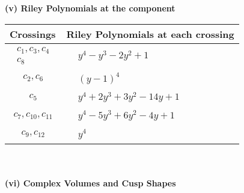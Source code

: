 \documentclass[1p]{elsarticle_modified}
\theoremstyle{definition}
\begin{document}
\newpage\renewcommand{\arraystretch}{1}
\flushleft \textbf{(v) Riley Polynomials at the component}\newline \\
\begin{tabular}{m{50pt}|m{274pt}}
Crossings & \hspace{64pt}Riley Polynomials at each crossing \\
\hline $$\begin{aligned}c_{1},c_{3},c_{4}\\c_{8}\end{aligned}$$&$\begin{aligned}
&y^4- y^3-2 y^2+1
\end{aligned}$\\
\hline $$\begin{aligned}c_{2},c_{6}\end{aligned}$$&$\begin{aligned}
&(y-1)^4
\end{aligned}$\\
\hline $$\begin{aligned}c_{5}\end{aligned}$$&$\begin{aligned}
&y^4+2 y^3+3 y^2-14 y+1
\end{aligned}$\\
\hline $$\begin{aligned}c_{7},c_{10},c_{11}\end{aligned}$$&$\begin{aligned}
&y^4-5 y^3+6 y^2-4 y+1
\end{aligned}$\\
\hline $$\begin{aligned}c_{9},c_{12}\end{aligned}$$&$\begin{aligned}
&y^4
\end{aligned}$\\
\hline
\end{tabular}\\~\\
\newpage\flushleft \textbf{(vi) Complex Volumes and Cusp Shapes}
\end{document}
